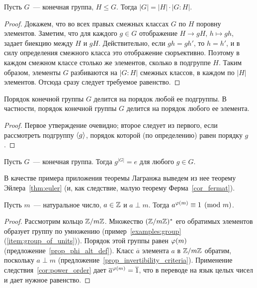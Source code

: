 \begin{theorem}
Пусть $G$~--- конечная группа, $H\leq G$. Тогда
$|G| = |H|\cdot |G:H|$.
\end{theorem}
\begin{proof}
Докажем, что во всех правых смежных классах $G$ по $H$ поровну
элементов. Заметим, что для каждого $g\in G$ отображение $H\to gH$,
$h\mapsto gh$, задает биекцию между $H$ и $gH$. Действительно, если
$gh=gh'$, то $h=h'$, и в силу определения смежного класса это
отображение сюръективно. Поэтому в каждом смежном классе столько же
элементов, сколько в подгруппе $H$. Таким образом, элементы $G$
разбиваются на $|G:H|$ смежных классов, в каждом по $|H|$
элементов. Отсюда сразу следует требуемое равенство.
\end{proof}
\begin{corollary}\label{cor:order_divides}
Порядок конечной группы $G$ делится на порядок любой ее подгруппы. В
частности, порядок конечной группы $G$ делится на порядок любого ее
элемента.
\end{corollary}
\begin{proof}
Первое утверждение очевидно; второе следует из первого, если
рассмотреть подгруппу $\langle g\rangle$, порядок которой (по определению)
равен порядку $g$.
\end{proof}

\begin{corollary}\label{cor:power_order}
Пусть $G$~--- конечная группа. Тогда $g^{|G|} = e$ для любого $g\in G$.
\end{corollary}

В качестве примера приложения теоремы Лагранжа выведем из нее теорему
Эйлера~\ref{thm:euler} (и, как следствие, малую теорему
Ферма~\ref{cor_fermat}).

\begin{theorem}
Пусть $m$~--- натуральное число, $a\in\mathbb Z$ и $a\perp m$. Тогда
$a^{\varphi(m)}\equiv 1\pmod m$.
\end{theorem}
\begin{proof}
Рассмотрим кольцо $\mathbb Z/m\mathbb Z$. Множество $(\mathbb Z/m\mathbb Z)^*$ его
обратимых элементов образует группу по умножению
(пример~\ref{examples:group} (\ref{item:group_of_units})). Порядок этой
группы равен $\varphi(m)$ (предложение~\ref{prop_phi_alt_def}).
Класс $\overline{a}$ элемента $a$ в $\mathbb Z/m\mathbb Z$ обратим, поскольку
$a\perp m$ (предложение~\ref{prop_invertibility_criteria}).
Применение следствия~\ref{cor:power_order} дает
$\overline{a}^{\varphi(m)}=\overline{1}$, что в переводе на язык целых
чисел и дает нужное равенство.
\end{proof}

